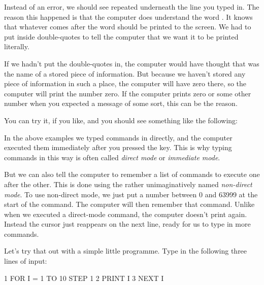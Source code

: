   Instead of an error, we should see  repeated underneath
  the line you typed in.  The reason this happened is that the computer
  does understand the word .  It knows that whatever comes after
  the word  should be printed to the screen.  We had to put  inside double-quotes to tell the computer that we want it to be
  printed literally.

  If we hadn't put the double-quotes in, the computer would have thought
  that  was the name of a stored piece of information.
  But because we haven't stored any piece of information in such a place,
  the computer will have zero there, so the computer will print the number
  zero. If the computer prints zero or some other number when
  you expected a message of some sort, this can be the reason.

\needspace{4cm} %
  You can try it, if you like, and you should see something like the following:


  In the above examples we typed commands in directly, and the computer executed
  them immediately after you pressed the  key.  This is why
  typing commands in this way is often called {\em direct mode} or {\em immediate mode}.

  But we can also tell the computer to remember a list of commands to execute one
  after the other.   This is done using the rather unimaginatively named {\em non-direct mode}.
  To use non-direct mode, we just put a number between 0 and 63999 at the start of
  the command.  The computer will then remember that command.  Unlike when we executed
  a direct-mode command, the computer doesn't print  again. Instead the cursor
  just reappears on the next line, ready for us to type in more commands.

\needspace{4cm} %
  Let's try that out with a simple little programme.  Type in the following three lines of
  input:

\begin{screenoutput}
1 FOR I = 1 TO 10 STEP 1
2 PRINT I
3 NEXT I
\end{screenoutput}

